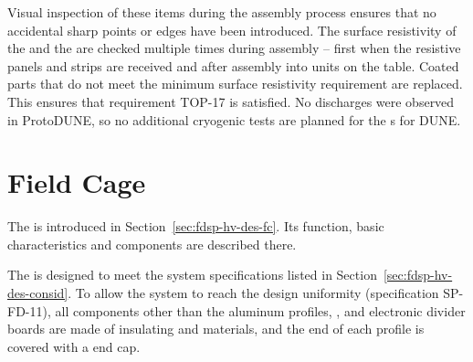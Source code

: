 Visual inspection of these items during the assembly process ensures that no accidental sharp points or edges have been introduced. The surface resistivity of the   and the  are checked multiple times during assembly -- first when the resistive panels and strips are received and after assembly into  units on the table.  Coated parts that do not meet the minimum surface resistivity requirement are replaced.  This ensures that requirement TOP-17 is satisfied. No discharges were observed in ProtoDUNE, so no additional cryogenic tests are planned for the s for DUNE.



\section{Field Cage}


The  is introduced in Section~\ref{sec:fdsp-hv-des-fc}. Its function, basic characteristics and components are described there. 

The  %
is designed to %
meet the system specifications listed in Section~\ref{sec:fdsp-hv-des-consid}. %
To allow the system to reach the design \efield{} uniformity 
(specification SP-FD-11), 
all components other than the aluminum profiles, , and electronic divider boards are made of insulating  and \frfour materials, and the end of each profile is covered with a  end cap. \\


